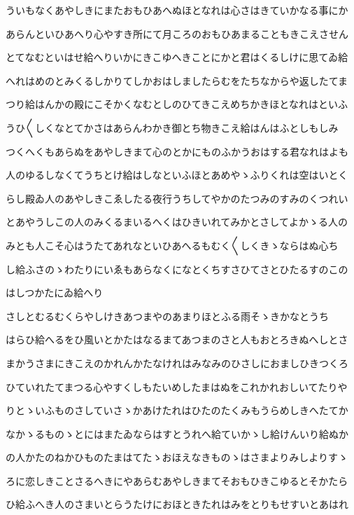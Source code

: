 \documentclass[a4paper,11pt,landscape]{ltjtarticle}
\begin{document}
ういもなくあやしきにまたおもひあへぬほとなれは心さはきていかなる事にか
\par\medskip
あらんといひあへり心やすき所にて月ころのおもひあまることもきこえさせん
\par\medskip
とてなむといはせ給へりいかにきこゆへきことにかと君はくるしけに思てゐ給
\par\medskip
へれはめのとみくるしかりてしかおはしましたらむをたちなからや返したてま
\par\medskip
つり給はんかの殿にこそかくなむとしのひてきこえめちかきほとなれはといふ
\par\medskip
うひ〱しくなとてかさはあらんわかき御とち物きこえ給はんはふとしもしみ
\par\medskip
つくへくもあらぬをあやしきまて心のとかにものふかうおはする君なれはよも
\par\medskip
人のゆるしなくてうちとけ給はしなといふほとあめやゝふりくれは空はいとく
\par\medskip
らし殿ゐ人のあやしきこゑしたる夜行うちしてやかのたつみのすみのくつれい
\par\medskip
とあやうしこの人のみくるまいるへくはひきいれてみかとさしてよかゝる人の
\par\medskip
みとも人こそ心はうたてあれなといひあへるもむく〱しくきゝならはぬ心ち
\par\medskip
し給ふさのゝわたりにいゑもあらなくになとくちすさひてさとひたるすのこの
\par\medskip
はしつかたにゐ給へり
\par\medskip
さしとむるむくらやしけきあつまやのあまりほとふる雨そゝきかなとうち
\par\medskip
はらひ給へるをひ風いとかたはなるまてあつまのさと人もおとろきぬへしとさ
\par\medskip
まかうさまにきこえのかれんかたなけれはみなみのひさしにおましひきつくろ
\par\medskip
ひていれたてまつる心やすくしもたいめしたまはぬをこれかれおしいてたりや
\par\medskip
りとゝいふものさしていさゝかあけたれはひたのたくみもうらめしきへたてか
\par\medskip
なかゝるものゝとにはまたゐならはすとうれへ給ていかゝし給けんいり給ぬか
\par\medskip
の人かたのねかひものたまはてたゝおほえなきものゝはさまよりみしよりすゝ
\par\medskip
ろに恋しきことさるへきにやあらむあやしきまてそおもひきこゆるとそかたら
\par\medskip
ひ給ふへき人のさまいとらうたけにおほときたれはみをとりもせすいとあはれ
\end{document}

